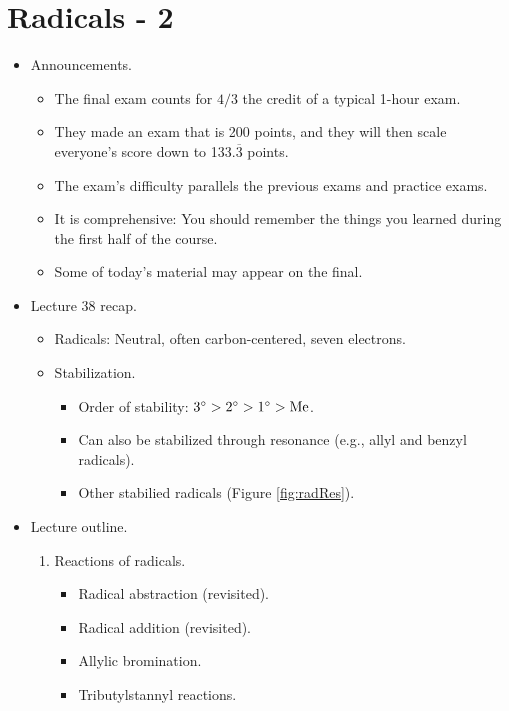 \documentclass[../notes.tex]{subfiles}
\begin{document}
\section{Radicals - 2}
\begin{itemize}
    \item {}Announcements.
    \begin{itemize}
        \item The final exam counts for $4/3$ the credit of a typical 1-hour exam.
        \item They made an exam that is 200 points, and they will then scale everyone's score down to 133.$\overline{3}$ points.
        \item The exam's difficulty parallels the previous exams and practice exams.
        \item It is comprehensive: You should remember the things you learned during the first half of the course.
        \item Some of today's material may appear on the final.
    \end{itemize}
    \item Lecture 38 recap.
    \begin{itemize}
        \item Radicals: Neutral, often carbon-centered, seven electrons.
        \item Stabilization.
        \begin{itemize}
            \item Order of stability: $3^\circ>2^\circ>1^\circ>\ce{Me}$.
            \item Can also be stabilized through resonance (e.g., allyl and benzyl radicals).
            \item Other stabilied radicals (Figure \ref{fig:radRes}).
        \end{itemize}
    \end{itemize}
    \item Lecture outline.
    \begin{enumerate}[label={\Alph*.},start=2]
        \item Reactions of radicals.
        \begin{itemize}
            \item Radical abstraction (revisited).
            \item Radical addition (revisited).
            \item Allylic bromination.
            \item Tributylstannyl reactions.

\end{itemize}
\end{enumerate}
\end{itemize}
\end{document}
